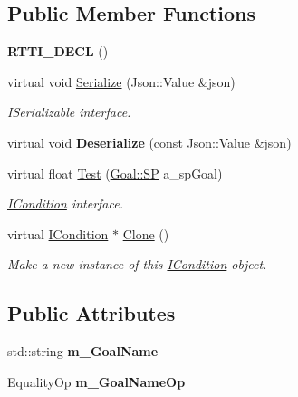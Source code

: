 \subsection*{Public Member Functions}
\begin{DoxyCompactItemize}
\item 
\mbox{\label{struct_goal_name_condition_a3d1e073f569f615538c5d20f177a5cf7}} 
{\bfseries R\+T\+T\+I\+\_\+\+D\+E\+CL} ()
\item 
\mbox{\label{struct_goal_name_condition_a08bd2b8874b8f3ea58f7f4c1526cc3a2}} 
virtual void \hyperlink{struct_goal_name_condition_a08bd2b8874b8f3ea58f7f4c1526cc3a2}{Serialize} (Json\+::\+Value \&json)
\begin{DoxyCompactList}\small\item\em I\+Serializable interface. \end{DoxyCompactList}\item 
\mbox{\label{struct_goal_name_condition_a3522c7e109bd8775ffef3dcc954106b7}} 
virtual void {\bfseries Deserialize} (const Json\+::\+Value \&json)
\item 
\mbox{\label{struct_goal_name_condition_a6434fe4ff3bef37f804d7ae350f7ccc2}} 
virtual float \hyperlink{struct_goal_name_condition_a6434fe4ff3bef37f804d7ae350f7ccc2}{Test} (\hyperlink{class_goal_a818ae12a4d1f28bd433dab2a830a390e}{Goal\+::\+SP} a\+\_\+sp\+Goal)
\begin{DoxyCompactList}\small\item\em \hyperlink{class_i_condition}{I\+Condition} interface. \end{DoxyCompactList}\item 
\mbox{\label{struct_goal_name_condition_aff885601dc4700c48b839baa7f5879b6}} 
virtual \hyperlink{class_i_condition}{I\+Condition} $\ast$ \hyperlink{struct_goal_name_condition_aff885601dc4700c48b839baa7f5879b6}{Clone} ()
\begin{DoxyCompactList}\small\item\em Make a new instance of this \hyperlink{class_i_condition}{I\+Condition} object. \end{DoxyCompactList}\end{DoxyCompactItemize}
\subsection*{Public Attributes}
\begin{DoxyCompactItemize}
\item 
\mbox{\label{struct_goal_name_condition_a41f43746b588130149494193a428de43}} 
std\+::string {\bfseries m\+\_\+\+Goal\+Name}
\item 
\mbox{\label{struct_goal_name_condition_a5612f0cd51b3f402ad168b05cc766225}} 
Equality\+Op {\bfseries m\+\_\+\+Goal\+Name\+Op}
\end{DoxyCompactItemize}
